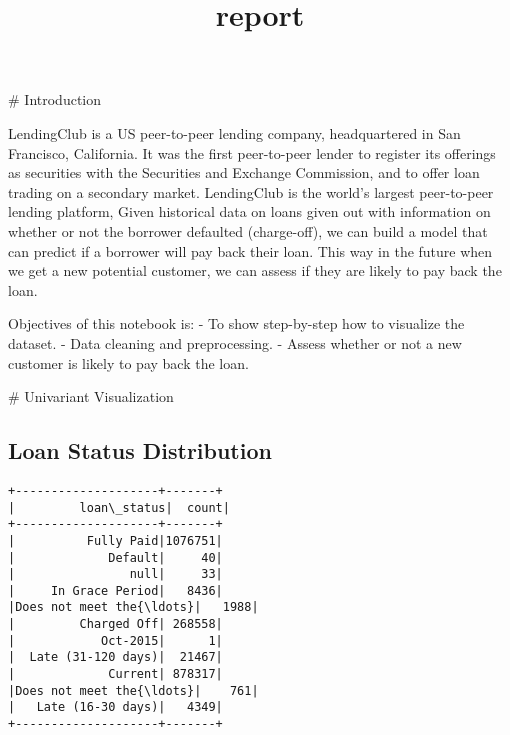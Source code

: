 \documentclass[11pt]{article}
\title{report}
\begin{document}
    
    \maketitle
    
    

    
    \# Introduction

    LendingClub is a US peer-to-peer lending company, headquartered in San
Francisco, California. It was the first peer-to-peer lender to register
its offerings as securities with the Securities and Exchange Commission,
and to offer loan trading on a secondary market. LendingClub is the
world's largest peer-to-peer lending platform, Given historical data on
loans given out with information on whether or not the borrower
defaulted (charge-off), we can build a model that can predict if a
borrower will pay back their loan. This way in the future when we get a
new potential customer, we can assess if they are likely to pay back the
loan.

Objectives of this notebook is: - To show step-by-step how to visualize
the dataset. - Data cleaning and preprocessing. - Assess whether or not
a new customer is likely to pay back the loan.

    \# Univariant Visualization

    \hypertarget{loan-status-distribution}{%
\subsection{Loan Status Distribution}\label{loan-status-distribution}}

    \begin{Verbatim}[commandchars=\\\{\}]
+--------------------+-------+
|         loan\_status|  count|
+--------------------+-------+
|          Fully Paid|1076751|
|             Default|     40|
|                null|     33|
|     In Grace Period|   8436|
|Does not meet the{\ldots}|   1988|
|         Charged Off| 268558|
|            Oct-2015|      1|
|  Late (31-120 days)|  21467|
|             Current| 878317|
|Does not meet the{\ldots}|    761|
|   Late (16-30 days)|   4349|
+--------------------+-------+

    \end{Verbatim}

    \begin{center}
    \end{center}
    { \hspace*{\fill} \\}
    
\end{document}
